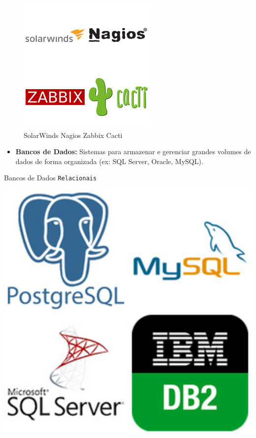 \documentclass[
]{book}
\providecommand{\tightlist}{%
  \setlength{\itemsep}{0pt}\setlength{\parskip}{0pt}}
\begin{document}
\begin{figure}
\centering
\includegraphics{images/InfraEstrutura/software/monitoramento.jpg}
\caption{SolarWinds Nagios Zabbix Cacti}
\end{figure}

\begin{itemize}
\tightlist
\item
  \textbf{Bancos de Dados:} Sistemas para armazenar e gerenciar grandes volumes de dados de forma organizada (ex: SQL Server, Oracle, MySQL).
\end{itemize}

Bancos de Dados \texttt{Relacionais}

\includegraphics[width=5.32292in,height=\textheight]{images/InfraEstrutura/SGBD/relacionais.jpg}
\end{document}
